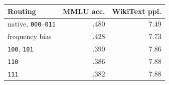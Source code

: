 \begin{tabular}{@{}lrr@{}}
\toprule
Routing & MMLU acc. & WikiText ppl. \\
\midrule
native, \texttt{000}--\texttt{011} & .480 & 7.49 \\
frequency bias & .428 & 7.73 \\
\texttt{100}, \texttt{101} & .390 & 7.86 \\
\texttt{110} & .386 & 7.88 \\
\texttt{111} & .382 & 7.88 \\
\bottomrule
\end{tabular}
